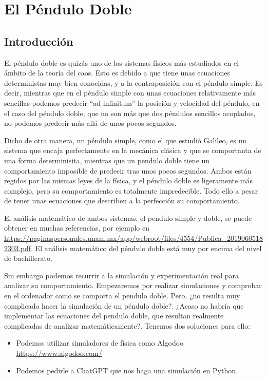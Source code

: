 \documentclass[
  10pt,
  a4paper,
  DIV=11,
  numbers=noendperiod,
  open=any]{scrreprt}
\providecommand{\tightlist}{%
  \setlength{\itemsep}{0pt}\setlength{\parskip}{0pt}}
\numberwithin{equation}{chapter}
\numberwithin{equation}{chapter}
\renewcommand{\[}{\begin{equation}}
\renewcommand{\]}{\end{equation}}
\begin{document}

\chapter{El Péndulo Doble}\label{el-puxe9ndulo-doble}

\section{Introducción}\label{introducciuxf3n-2}

El péndulo doble es quizás uno de los sistemas físicos más estudiados en
el ámbito de la teoría del caos. Esto es debido a que tiene unas
ecuaciones deterministas muy bien conocidas, y a la contraposición con
el péndulo simple. Es decir, mientras que en el péndulo simple con unas
ecuaciones relativamente más sencillas podemos predecir ``ad infinitum''
la posición y velocidad del péndulo, en el caso del péndulo doble, que
no son más que dos péndulos sencillos acoplados, no podemos predecir más
allá de unos pocos segundos.

Dicho de otra manera, un péndulo simple, como el que estudió Galileo, es
un sistema que encaja perfectamente en la mecánica clásica y que se
comportanta de una forma determinisita, mientras que un pendulo doble
tiene un comportamiento imposible de predecir tras unos pocos segundos.
Ambos están regidos por las mismas leyes de la física, y el péndulo
doble es ligeramente más complejo, pero su comportamiento es totalmente
impredecible. Todo ello a pesar de tener unas ecuaciones que describen a
la perfección su comportamiento.

El análisis matemático de ambos sistemas, el pendulo simple y doble, se
puede obtener en muchas referencias, por ejemplo en
\url{https://paginaspersonales.unam.mx/app/webroot/files/4554/Publica_20190605182303.pdf}.
El análisis matemático del péndulo doble está muy por encima del nivel
de bachillerato.

Sin embargo podemos recurrir a la simulación y experimentación real para
analizar su comportamiento. Empezaremos por realizar simulaciones y
comprobar en el ordenador como se comporta el pendulo doble. Pero, ¿no
resulta muy complicado hacer la simulación de un péndulo doble?. ¿Acaso
no habría que implementar las ecuaciones del pendulo doble, que resultan
realmente complicadas de analizar matemáticamente?. Tenemos dos
soluciones para ello:

\begin{itemize}
\tightlist
\item
  Podemos utilizar simuladores de física como Algodoo
  \url{https://www.algodoo.com/}
\item
  Podemos pedirle a ChatGPT que nos haga una simulación en Python.
\end{itemize}
\end{document}

